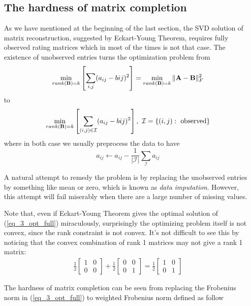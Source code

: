 \documentclass[../book-template.tex]{subfiles}
\begin{document}
\subsection{The hardness of matrix completion}
As we have mentioned at the beginning of the last section, the SVD solution of matrix reconstruction, suggested by Eckart-Young Theorem, requires fully observed rating matrices which in most of the times is not that case. The existence of unobserved entries turns the optimization problem from
\begin{equation}\label{eq_3_opt_full}
	\min_{rank({\bf B})=k}\left[\sum_{i,j}(a_{ij}-b{ij})^2 \right]=	\min_{rank({\bf B})=k}\|{\bf A}-{\bf B}\|_F^2
\end{equation} 
to
\begin{equation}\label{eq_3_opt_partial}
\min_{rank({\bf B})=k}\left[\sum_{(i,j)\in \mathcal{I}}(a_{ij}-b{ij})^2 \right],\ \mathcal{I}=\{(i,j):\ \text{observed}\}
\end{equation} 
where in both case we usually preprocess the data to have 
$$a_{ij}\leftarrow a_{ij}-\frac{1}{|\mathcal{I}|}\sum_{\mathcal{I}}a_{ij}$$
\par A natural attempt to remedy the problem is by replacing the unobserved entries by something like mean or zero, which is known as \emph{data imputation}. However, this attempt will fail miserably when there are a large number of missing values. 
\par Note that, even if Eckart-Young Theorem gives the optimal solution of (\ref{eq_3_opt_full}) miraculously, surprisingly the optimizing problem itself is not convex, since the rank constraint is not convex. It's not difficult to see this by noticing that the convex combination of rank 1 matrices may not give a rank 1 matrix:
\begin{equation*}
	\begin{gathered}
		\frac{1}{2}\begin{bmatrix}
		1 & 0 \\ 0 & 0
		\end{bmatrix} + 
		\frac{1}{2}\begin{bmatrix}
		0 & 0 \\ 0 & 1
		\end{bmatrix} =
		\frac{1}{2}\begin{bmatrix}
		1 & 0 \\ 0 & 1
		\end{bmatrix}
	\end{gathered}
\end{equation*}
\par The hardness of matrix completion can be seen from replacing the Frobenius norm in (\ref{eq_3_opt_full}) to weighted Frobenius norm defined as follow
\end{document}
